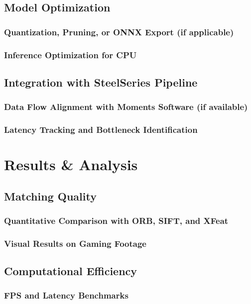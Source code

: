 \documentclass[a4paper,12pt]{report}
\begin{document}
\section{Model Optimization}
\subsection{Quantization, Pruning, or ONNX Export (if applicable)}
\subsection{Inference Optimization for CPU}

\section{Integration with SteelSeries Pipeline}
\subsection{Data Flow Alignment with Moments Software (if available)}
\subsection{Latency Tracking and Bottleneck Identification}

\chapter{Results \& Analysis}
\section{Matching Quality}
\subsection{Quantitative Comparison with ORB, SIFT, and XFeat}
\subsection{Visual Results on Gaming Footage}

\section{Computational Efficiency}
\subsection{FPS and Latency Benchmarks}
\end{document}
